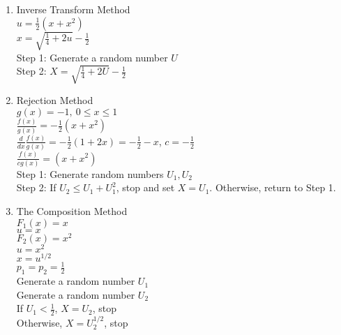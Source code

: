 \documentclass{article}
\begin{document}
\subsection{}
\begin{enumerate}[label=(\alph*)]
    \item Inverse Transform Method \\
    $u = \frac{1}{2}(x+x^2)$ \\
    $x = \sqrt{\frac{1}{4}+2u} - \frac{1}{2}$ \\
    Step 1: Generate a random number $U$\\
    Step 2: $X = \sqrt{\frac{1}{4}+2U} - \frac{1}{2}$ \\
    \item Rejection Method \\
    $g(x) = -1,~0\leq x \leq 1$ \\
    $\frac{f(x)}{g(x)} = -\frac{1}{2}(x+x^2)$ \\
    $\frac{d}{dx}\frac{f(x)}{g(x)} = -\frac{1}{2}(1+2x) = -\frac{1}{2} - x$, $c = -\frac{1}{2}$ \\
    $\frac{f(x)}{cg(x)} = (x+x^2)$ \\
    Step 1: Generate random numbers $U_1,U_2$ \\
    Step 2: If $U_2 \leq U_1+U_1^2$, stop and set $X = U_1$. Otherwise, return to Step 1. \\
    \item The Composition Method \\
    $F_1(x) = x$ \\
$u = x$ \\
$F_2(x) = x^2$ \\
$u = x^2$ \\
$x = u^{1/2}$ \\
$p_1=p_2=\frac{1}{2}$ \\
Generate a random number $U_1$ \\
Generate a random number $U_2$ \\
If $U_1 < \frac{1}{2}$, $X = U_2$, stop \\
Otherwise, $X = U_2^{1/2}$, stop \\
\end{enumerate}
\end{document}
